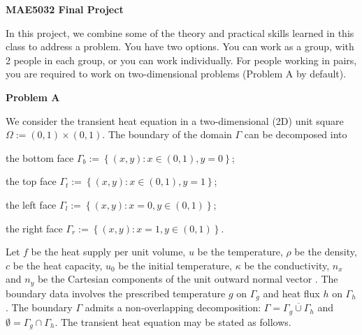 \documentclass[12pt]{article}
\begin{document}
\begin{center}
\textbf{\Large
MAE5032 Final Project
}





\end{center}

In this project, we combine some of the theory and practical skills learned in this class to address a problem. You have two options. You can work as a group, with 2 people in each group, or you can work individually. For people working in pairs, you are required to work on two-dimensional problems (Problem A by default).

\textbf{Problem A}

We consider the transient heat equation in a two-dimensional (2D) unit square $\Omega := (0,1)\times(0,1)$. The boundary of the domain $\Gamma$ can be decomposed into
\begin{description}
\item the bottom face $\Gamma_b := \left\lbrace (x,y) : x \in (0,1), y = 0 \right\rbrace$;
\item the top face $\Gamma_t := \left\lbrace (x,y) : x \in (0,1),  y = 1 \right\rbrace$;
\item the left face $\Gamma_l := \left\lbrace (x,y) : x=0, y \in (0,1) \right\rbrace$;
\item the right face $\Gamma_r := \left\lbrace (x,y) : x=1, y \in (0,1) \right\rbrace$.
\end{description}
Let $f$ be the heat supply per unit volume, $u$ be the temperature,  $\rho$ be the density, $c$ be the heat capacity, $u_0$ be the initial temperature, $\kappa$ be the conductivity, $n_x$ and $n_y$ be the Cartesian components of the unit outward normal vector . The boundary data involves the prescribed temperature $g$ on $\Gamma_g$ and heat flux $h$ on $\Gamma_h$. The boundary $\Gamma$ admits a non-overlapping decomposition: $\Gamma = \overline{\Gamma_{g} \cup \Gamma_h}$ and $\emptyset = \Gamma_g \cap \Gamma_h$. The transient heat equation may be stated as follows.
\end{document}
